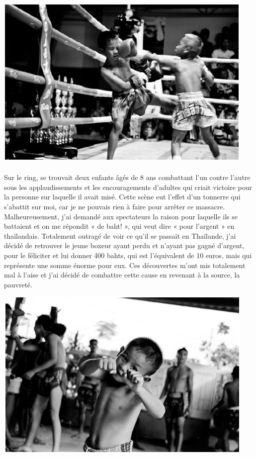 \begin{center}
	\includegraphics[scale=0.7]{Thai2.jpg}
\end{center}

\paragraph{} Sur le ring, se trouvait deux enfants âgés de 8 ans combattant
l'un contre l'autre sous les applaudissements et les encouragements d'adultes
qui criait victoire pour la personne sur laquelle il avait misé. Cette scène
eut l'effet d'un tonnerre qui s'abattit sur moi, car je ne pouvais rien à faire
pour arrêter ce massacre.  Malheureusement, j'ai demandé aux spectateurs la
raison pour laquelle ils se battaient et on me répondit « de baht! », qui veut
dire « pour l'argent » en thaïlandais. Totalement outragé de voir ce qu'il se
passait en Thaïlande, j'ai décidé de retrouver le jeune boxeur ayant perdu et
n'ayant pas gagné d'argent, pour le féliciter et lui donner 400 bahts, qui est
l'équivalent de 10 euros, mais qui représente une somme énorme pour eux.  Ces
découvertes m'ont mis totalement mal à l'aise et j'ai décidé de combattre cette
cause en revenant à la source, la pauvreté.

\begin{center}
	\includegraphics[scale=0.7]{Thai3.jpg}
\end{center}

